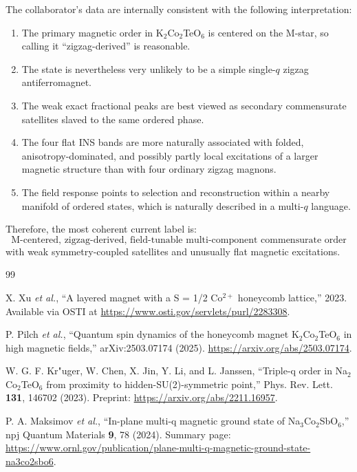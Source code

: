 \documentclass[11pt]{article}
\begin{document}
The collaborator's data are internally consistent with the following interpretation:

\begin{enumerate}[leftmargin=2em,itemsep=0.35em]
    \item The primary magnetic order in K$_2$Co$_2$TeO$_6$ is centered on the M-star, so calling it ``zigzag-derived'' is reasonable.
    \item The state is nevertheless very unlikely to be a simple single-$q$ zigzag antiferromagnet.
    \item The weak exact fractional peaks are best viewed as secondary commensurate satellites slaved to the same ordered phase.
    \item The four flat INS bands are more naturally associated with folded, anisotropy-dominated, and possibly partly local excitations of a larger magnetic structure than with four ordinary zigzag magnons.
    \item The field response points to selection and reconstruction within a nearby manifold of ordered states, which is naturally described in a multi-$q$ language.
\end{enumerate}

Therefore, the most coherent current label is:
\begin{equation}
\boxed{\text{M-centered, zigzag-derived, field-tunable multi-component commensurate order}}
\end{equation}
with weak symmetry-coupled satellites and unusually flat magnetic excitations.

\begin{thebibliography}{99}

X. Xu \emph{et al.}, ``A layered magnet with a S = 1/2 Co$^{2+}$ honeycomb lattice,'' 2023. Available via OSTI at \href{https://www.osti.gov/servlets/purl/2283308}{https://www.osti.gov/servlets/purl/2283308}.

P. Pilch \emph{et al.}, ``Quantum spin dynamics of the honeycomb magnet K$_2$Co$_2$TeO$_6$ in high magnetic fields,'' arXiv:2503.07174 (2025). \href{https://arxiv.org/abs/2503.07174}{https://arxiv.org/abs/2503.07174}.

W. G. F. Kr"uger, W. Chen, X. Jin, Y. Li, and L. Janssen, ``Triple-q order in Na$_2$Co$_2$TeO$_6$ from proximity to hidden-SU(2)-symmetric point,'' Phys. Rev. Lett. \textbf{131}, 146702 (2023). Preprint: \href{https://arxiv.org/abs/2211.16957}{https://arxiv.org/abs/2211.16957}.

P. A. Maksimov \emph{et al.}, ``In-plane multi-q magnetic ground state of Na$_3$Co$_2$SbO$_6$,'' npj Quantum Materials \textbf{9}, 78 (2024). Summary page: \href{https://www.ornl.gov/publication/plane-multi-q-magnetic-ground-state-na3co2sbo6}{https://www.ornl.gov/publication/plane-multi-q-magnetic-ground-state-na3co2sbo6}.

\end{thebibliography}
\end{document}
